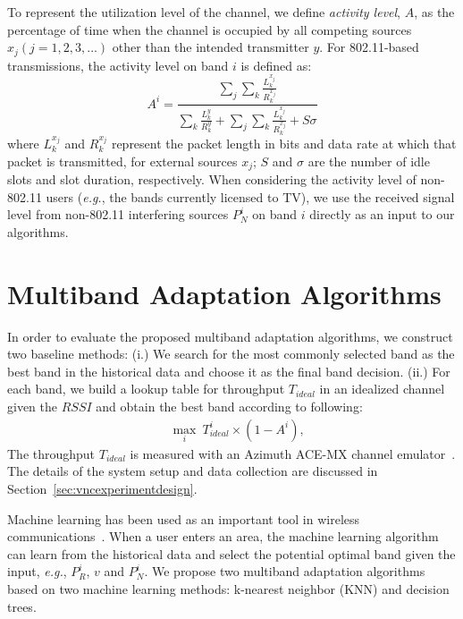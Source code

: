 To represent the utilization level of the channel, we define \emph{activity level}, $A$,
as the percentage of time when the channel is occupied by 
all competing sources $x_j (j = 1, 2, 3, ...)$ other than the intended transmitter $y$. 
For 802.11-based transmissions, the activity level on band $i$ is defined as:
\begin{equation}
\label{eqn:80211activity}
A^i = \frac{\sum_j{\sum_k{\frac{L_k^{x_j}}{R_k^{x_j}}}}}{\sum_k{\frac{L_k^y}{R_k^y}}+\sum_j{\sum_k{\frac{L_k^{x_j}}{R_k^{x_j}}}}+S\sigma}
\end{equation}
where $L_k^{x_j}$ and $R_k^{x_j}$ represent the packet length in bits and data
rate at which that packet is transmitted, for external sources $x_j$;
$S$ and $\sigma$ are the number of idle slots and slot duration, respectively. 
When considering the activity level of non-802.11 users 
({\it e.g.}, the bands currently licensed to TV),
we use the received signal level from non-802.11 interfering sources $P_N^i$ 
on band $i$ directly as an input to our algorithms. 

\section{Multiband Adaptation Algorithms}
\label{subsec:algorithms}

In order to evaluate the proposed multiband adaptation algorithms, 
we construct two baseline methods: (i.) We search for the
most commonly selected band as the best band in the historical data
and choose it as the final band decision. (ii.) For each band, we build 
a lookup table for throughput $T_{ideal}$ in an idealized channel given the $RSSI$ and obtain 
the best band according to following:
\begin{align}
&\max_i\ T_{ideal}^i\times(1-A^i),
\label{eq:baseline2}
\end{align}
The throughput $T_{ideal}$ is measured with an Azimuth ACE-MX channel emulator~\cite{AzimuthACE}. 
The details of the system setup and data collection are discussed in Section~\ref{sec:vncexperimentdesign}. 

Machine learning has been used as an important tool in wireless communications~\cite{haykin2005cognitive}. When a user enters an area, the machine
learning algorithm can learn from the historical data and
select the potential optimal band given the input, {\it e.g.}, $P_R^i$, $v$
and $P_N^i$. We propose two multiband adaptation algorithms based on
two machine learning methods: k-nearest neighbor (KNN) and decision trees.

